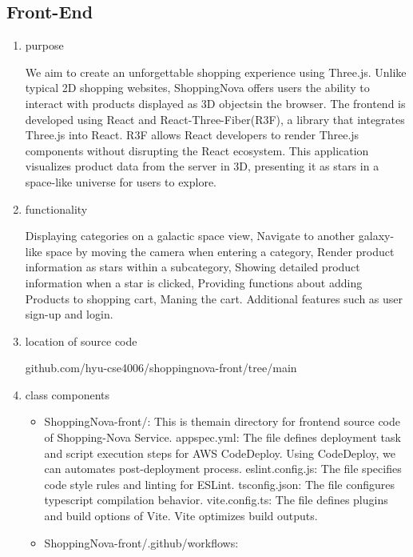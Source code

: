\documentclass[conference]{IEEEtran}
\begin{document}
\subsection{Front-End}
\begin{enumerate}
\setlength{\parindent}{2ex}
\item purpose

We aim to create an unforgettable shopping experience using Three.js.
Unlike typical 2D shopping websites, ShoppingNova offers users the ability to interact with products displayed as 3D objectsin the browser.
The frontend is developed using React and React-Three-Fiber(R3F), a library that integrates Three.js into React.
R3F allows React developers to render Three.js components without disrupting the React ecosystem.
This application visualizes product data from the server in 3D, presenting it as stars in a space-like universe for users to explore.

\item functionality

Displaying categories on a galactic space view, Navigate to another galaxy-like space by moving the camera when entering a category, Render product information as stars within a subcategory, Showing detailed product information when a star is clicked, Providing functions about adding Products to shopping cart, Maning the cart. Additional features such as user sign-up and login.

\item location of source code

github.com/hyu-cse4006/shoppingnova-front/tree/main

\item class components
\begin{itemize}
\item ShoppingNova-front/: This is themain directory for frontend source code of Shopping-Nova Service.\newline
appspec.yml: The file defines deployment task and script execution steps for AWS CodeDeploy. Using CodeDeploy, we can automates post-deployment process.\newline
eslint.config.js: The file specifies code style rules and linting for ESLint.\newline
tsconfig.json: The file configures typescript compilation behavior.\newline
vite.config.ts: The file defines plugins and build options of Vite. Vite optimizes build outputs.

\item ShoppingNova-front/.github/workflows:


\end{itemize}
\end{enumerate}
\end{document}
